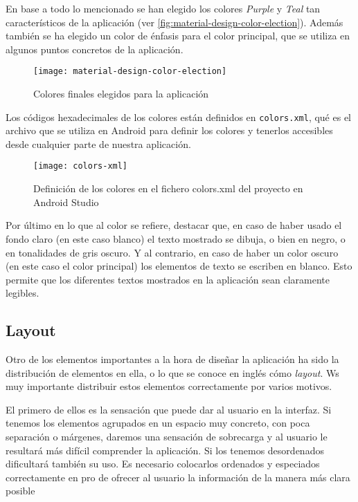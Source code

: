 En base a todo lo mencionado se han elegido los colores \textit{Purple} y \textit{Teal} tan característicos de la aplicación (ver \autoref{fig:material-design-color-election}). Además también se ha elegido un color de énfasis para el color principal, que se utiliza en algunos puntos concretos de la aplicación.

\begin{figure}[H]
	\centering
	\texttt{[image: material-design-color-election]}
	\caption{Colores finales elegidos para la aplicación}
	\label{fig:material-design-color-election}
\end{figure}

Los códigos hexadecimales de los colores están definidos en \texttt{colors.xml}, qué es el archivo que se utiliza en Android para definir los colores y tenerlos accesibles desde cualquier parte de nuestra aplicación.

\begin{figure}[H]
	\centering
	\texttt{[image: colors-xml]}
	\caption{Definición de los colores en el fichero colors.xml del proyecto en Android Studio}
	\label{fig:colors-xml}
\end{figure}

Por último en lo que al color se refiere, destacar que, en caso de haber usado el fondo claro (en este caso blanco) el texto mostrado se dibuja, o bien en negro, o en tonalidades de gris oscuro. Y al contrario, en caso de haber un color oscuro (en este caso el color principal) los elementos de texto se escriben en blanco. Esto permite que los diferentes textos mostrados en la aplicación sean claramente legibles.

\subsection{Layout}

Otro de los elementos importantes a la hora de diseñar la aplicación ha sido la distribución de elementos en ella, o lo que se conoce en inglés cómo \textit{layout}. Ws muy importante distribuir estos elementos correctamente por varios motivos.

El primero de ellos es la sensación que puede dar al usuario en la interfaz. Si tenemos los elementos agrupados en un espacio muy concreto, con poca separación o márgenes, daremos una sensación de  sobrecarga y al usuario le resultará más difícil comprender la aplicación. Si los tenemos desordenados dificultará también su uso. Es necesario colocarlos ordenados y especiados correctamente en pro de ofrecer al usuario la información de la manera más clara posible

